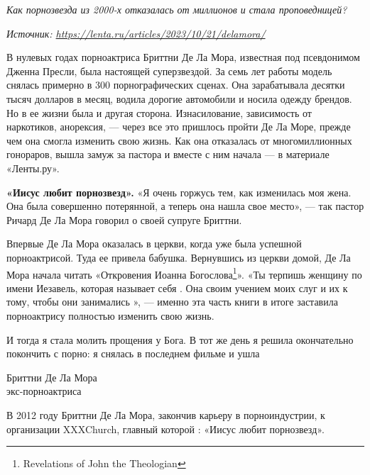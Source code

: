 \textit{Как порнозвезда из 2000-х отказалась от миллионов и стала проповедницей?}

\textit{Источник: \url{https://lenta.ru/articles/2023/10/21/delamora/}}

В нулевых годах порноактриса Бриттни Де Ла Мора, известная под псевдонимом Дженна Пресли, была настоящей суперзвездой. За семь лет работы модель снялась примерно в 300 порнографических сценах. Она зарабатывала десятки тысяч долларов в месяц, водила дорогие автомобили и носила одежду  брендов. Но в ее жизни была и другая сторона. Изнасилование, зависимость от наркотиков, анорексия,  --- через все это пришлось пройти Де Ла Море, прежде чем она смогла изменить свою жизнь. Как она отказалась от многомиллионных гонораров, вышла замуж за пастора и вместе с ним начала  --- в материале «Ленты.ру».

\textbf{«Иисус любит порнозвезд».} «Я очень горжусь тем, как изменилась моя жена. Она была совершенно потерянной, а теперь она нашла свое место», --- так пастор Ричард Де Ла Мора говорил о своей супруге Бриттни.

Впервые Де Ла Мора оказалась в церкви, когда уже была успешной порноактрисой. Туда ее привела бабушка. Вернувшись из церкви домой, Де Ла Мора начала читать «Откровения Иоанна Богослова\footnote{Revelations of John the Theologian}». «Ты терпишь женщину по имени Иезавель, которая называет себя . Она своим учением  моих слуг и  их к тому, чтобы они занимались », --- именно эта часть книги в итоге заставила порноактрису полностью изменить свою жизнь.

\begin{fancyquotes}
    И тогда я стала молить прощения у Бога. В тот же день я решила окончательно покончить с порно: я снялась в последнем фильме и ушла\\

    \begin{flushright}
        Бриттни Де Ла Мора\\
        экс-порноактриса
    \end{flushright}
\end{fancyquotes}

В 2012 году Бриттни Де Ла Мора, закончив карьеру в порноиндустрии,  к организации XXXChurch, главный  которой : «Иисус любит порнозвезд».

